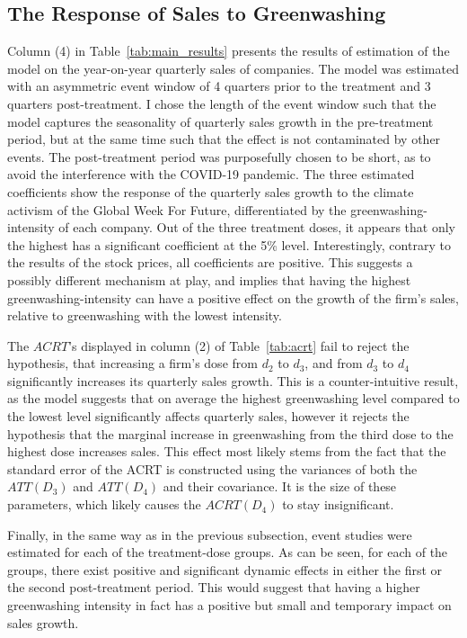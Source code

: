 \documentclass[12pt]{article}
\begin{document}


\subsection{The Response of Sales to Greenwashing}

Column (4) in Table~\ref{tab:main_results} presents the results of estimation of the model on the year-on-year quarterly sales of companies. The model was estimated with an asymmetric event window of 4 quarters prior to the treatment and 3 quarters post-treatment. I chose the length of the event window such that the model captures the seasonality of quarterly sales growth in the pre-treatment period, but at the same time such that the effect is not contaminated by other events. The post-treatment period was purposefully chosen to be short, as to avoid the interference with the COVID-19 pandemic. The three estimated coefficients show the response of the quarterly sales growth to the climate activism of the Global Week For Future, differentiated by the greenwashing-intensity of each company. Out of the three treatment doses, it appears that only the highest has a significant coefficient at the 5\% level. Interestingly, contrary to the results of the stock prices, all coefficients are positive. This suggests a possibly different mechanism at play, and implies that having the highest greenwashing-intensity can have a positive effect on the growth of the firm's sales, relative to greenwashing with the lowest intensity.

The $ACRT$'s displayed in column (2) of Table~\ref{tab:acrt} fail to reject the hypothesis, that increasing a firm's dose from $d_2$ to $d_3$, and from $d_3$ to $d_4$ significantly increases its quarterly sales growth. This is a counter-intuitive result, as the model suggests that on average the highest greenwashing level compared to the lowest level significantly affects quarterly sales, however it rejects the hypothesis that the marginal increase in greenwashing from the third dose to the highest dose increases sales. This effect most likely stems from the fact that the standard error of the ACRT is constructed using the variances of both the $ATT(D_3)$ and $ATT(D_4)$ and their covariance. It is the size of these parameters, which likely causes the $ACRT(D_4)$ to stay insignificant.

Finally, in the same way as in the previous subsection, event studies were estimated for each of the treatment-dose groups. As can be seen, for each of the groups, there exist positive and significant dynamic effects in either the first or the second post-treatment period. This would suggest that having a higher greenwashing intensity in fact has a positive but small and temporary impact on sales growth.
\end{document}
